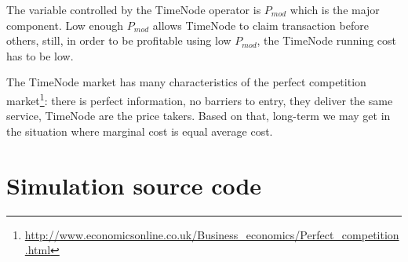 \documentclass{article}
\begin{document}
  The variable controlled by the TimeNode operator is $P_{mod}$ which is the major component. Low enough $P_{mod}$ allows TimeNode to claim transaction before others, still, in order to be profitable using low $P_{mod} $, the TimeNode running cost has to be low.     
  
  The TimeNode market has many characteristics of the perfect competition market\footnote{\url{http://www.economicsonline.co.uk/Business_economics/Perfect_competition.html}}: there is perfect information, no barriers to entry, they deliver the same service, TimeNode are the price takers. Based on that, long-term we may get in the situation where marginal cost is equal average cost. 
  \appendix
  \section{Simulation source code}
  
  
  
\end{document}
